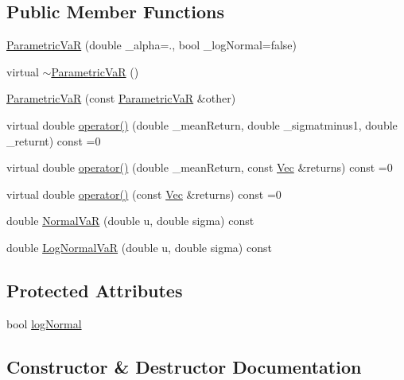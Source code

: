 \subsection*{Public Member Functions}
\begin{DoxyCompactItemize}
\item 
\hyperlink{classParametricVaR_a679d72495a95d6c1be912118101a95e1}{Parametric\+VaR} (double \+\_\+alpha=., bool \+\_\+log\+Normal=false)
\item 
virtual \hyperlink{classParametricVaR_a9345f4d02e6f1facb29922d2c4be504c}{$\sim$\+Parametric\+VaR} ()
\item 
\hyperlink{classParametricVaR_aa028595da1c747f5c1887eb07157139a}{Parametric\+VaR} (const \hyperlink{classParametricVaR}{Parametric\+VaR} \&other)
\item 
virtual double \hyperlink{classParametricVaR_a54589e13bb45da786d574656eb67b5fb}{operator()} (double \+\_\+mean\+Return, double \+\_\+sigmatminus1, double \+\_\+returnt) const =0
\item 
virtual double \hyperlink{classParametricVaR_a5fda9d0e1033ff6e93dd112555ee5e0b}{operator()} (double \+\_\+mean\+Return, const \hyperlink{compute__returns__eigen_8h_a1eb6a9306ef406d7975f3cbf2e247777}{Vec} \&returns) const =0
\item 
virtual double \hyperlink{classParametricVaR_aa07f1d64aff5abf484835cd9105af9c9}{operator()} (const \hyperlink{compute__returns__eigen_8h_a1eb6a9306ef406d7975f3cbf2e247777}{Vec} \&returns) const =0
\item 
double \hyperlink{classParametricVaR_afdcc1e8748cff0a19d731f7a22c1d0c9}{Normal\+VaR} (double u, double sigma) const
\item 
double \hyperlink{classParametricVaR_aa26635a0fe04bd06580c50855360128a}{Log\+Normal\+VaR} (double u, double sigma) const
\end{DoxyCompactItemize}
\subsection*{Protected Attributes}
\begin{DoxyCompactItemize}
\item 
bool \hyperlink{classParametricVaR_a6e1dd396274079af9e1fc21068213866}{log\+Normal}
\end{DoxyCompactItemize}


\subsection{Constructor \& Destructor Documentation}
\hypertarget{classParametricVaR_a679d72495a95d6c1be912118101a95e1}{}\label{classParametricVaR_a679d72495a95d6c1be912118101a95e1} 
